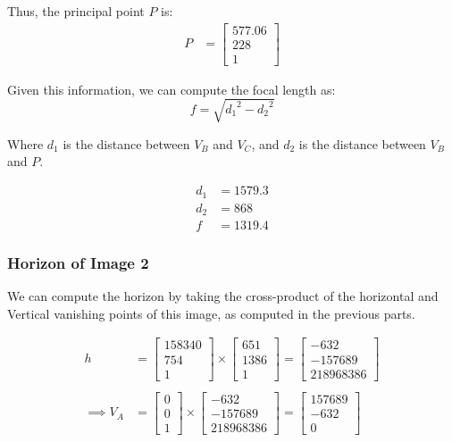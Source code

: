 \documentclass[12pt, oneside]{article}
\begin{document}
Thus, the principal point $P$ is:
\begin{align*}
    P &= \begin{bmatrix}577.06 \\ 228 \\1 \end{bmatrix} 
\end{align*}

Given this information, we can compute the focal length as:
$$ f = \sqrt{{d_1}^2 - {d_2}^2} $$

Where $d_1$ is the distance between $V_B$ and $V_C$, and $d_2$ is the distance
between $V_B$ and $P$.

\begin{align*}
    d_1 &=  1579.3 \\
    d_2 &= 868 \\ 
    f &= 1319.4
\end{align*}




\subsubsection*{Horizon of Image 2} 

We can compute the horizon by taking the cross-product of the horizontal and Vertical
vanishing points of this image, as computed in the previous parts.

\begin{align*}
h   &=  \begin{bmatrix} 158340  \\ 754 \\ 1  \end{bmatrix} \times 
        \begin{bmatrix} 651   \\ 1386 \\   1   \end{bmatrix} 
    =  \begin{bmatrix} -632   \\ -157689   \\ 218968386   \end{bmatrix}  \\ \\   
\implies V_A  &=  \begin{bmatrix} 0   \\ 0   \\ 1   \end{bmatrix} \times
        \begin{bmatrix} -632   \\ -157689   \\ 218968386   \end{bmatrix} 
    =  \begin{bmatrix} 157689   \\ -632   \\ 0   \end{bmatrix} 
\end{align*}
\end{document}
